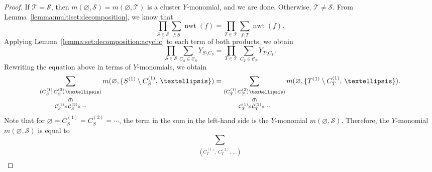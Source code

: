 \documentclass[11pt]{article}
\theoremstyle{definition}
\numberwithin{equation}{section}
\newcommand{\mtp}[1]{^{(#1)}} \newcommand{\graph}{\varGamma}
\DeclareMathOperator{\normalizedweight}{nwt}
\newcommand{\monomial}[2]{m(#1, #2)}
\begin{document}
\begin{proof}
    If \(\mathcal{T} = \mathcal{S}\), then \(\monomial{\varnothing}{\mathcal{S}} = \monomial{\varnothing}{\mathcal{T}}\) is a cluster \(Y\)-monomial, and we are done.
    Otherwise, \(\mathcal{T} \neq \mathcal{S}\).
    From Lemma~\ref{lemma:multiset:decomposition}, we know that
    \begin{equation*}
        \prod_{S \in \mathcal{S}} \sum_{f : S} \normalizedweight(f) = \prod_{T \in \mathcal{T}} \sum_{f : T} \normalizedweight(f).
    \end{equation*}
    Applying Lemma~\ref{lemma:set:decomposition:acyclic} to each term of both products, we obtain
    \begin{equation*}
        \prod_{S \in \mathcal{S}} \sum_{C_S \in \mathcal{C}_S} Y_{S \setminus C_S}
        =
        \prod_{T \in \mathcal{T}} \sum_{C_{T} \in \mathcal{C}_{T}} Y_{T \setminus C_{T}}.
    \end{equation*}
    Rewriting the equation above in terms of \(Y\)-monomials, we obtain
    \begin{equation*}
        \sum_{ \substack{
                (C_S\mtp{1}\!\!,\,
                C_S\mtp{2}\!\!,\,\dots) \\
                \rotatebox{-90}{\(\in\)} \\
                \mathcal{C}_S\mtp{1}\!\times \mathcal{C}_S\mtp{2}\!\times \cdots }
                }
                \monomial{\varnothing}{
                    \{ 
                        S\mtp{1} \setminus C_S\mtp{1},\,
                        \dots
                    \}
                }
        =
        \sum_{ \substack{
                (C_{T}\mtp{1}\!\!,\,
                C_{T}\mtp{2}\!\!,\,\dots) \\
                \rotatebox{-90}{\(\in\)} \\
                \mathcal{C}_{T}\mtp{1}\!\times \mathcal{C}_{T}\mtp{2}\!\times \cdots }
                }
                \monomial{\varnothing}{
                    \{ 
                        T\mtp{1} \setminus C_{T}\mtp{1},\,
                        \dots
                    \}
                }.
    \end{equation*}
    Note that for \(\varnothing = C_S\mtp{1} = C_S\mtp{2} = \cdots\), the term in the sum in the left-hand side is the \(Y\)-monomial \(\monomial{\varnothing}{\mathcal{S}}\).
    Therefore, the \(Y\)-monomial \(\monomial{\varnothing}{\mathcal{S}}\) is equal to
    \begin{equation} \label{eq:rewrite-mos}
        \sum_{ \substack{
            (C_{T}\mtp{1}\!\!,\,
            C_{T}\mtp{2}\!\!,\,\dots) \\
}}
\end{equation}
\end{proof}
\end{document}
